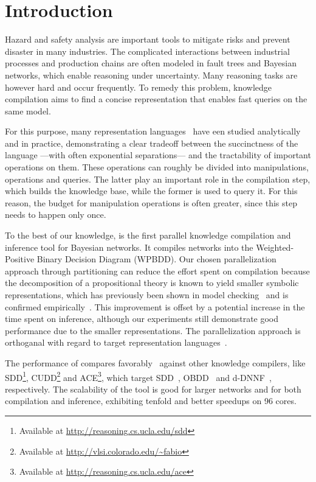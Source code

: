 
\section{Introduction}
\label{sec:introduction}

Hazard and safety analysis are important tools to mitigate risks and prevent disaster in many industries. The complicated interactions between industrial processes and production chains are often modeled in fault trees and Bayesian networks, which enable reasoning under uncertainty.
Many reasoning tasks are however hard and occur frequently. To remedy this problem, knowledge compilation aims to find a concise representation that enables fast queries on the same model.

For this purpose, many representation languages~\cite{darwiche2001decomposable,darwiche2002logical,darwiche2011sdd,darwiche2002knowledge,fargier2014knowledge,sanner2005affine,tafertshofer1997factored} have een studied analytically and in practice, demonstrating a clear tradeoff between the succinctness of the language ---with often exponential separations--- and the tractability of important operations on them. These operations can roughly be divided into manipulations, operations and queries. The latter play an important role in the compilation step, which builds the knowledge base, while the former is used to query it. For this reason, the budget for manipulation operations is often greater, since this step needs to happen only once.

To the best of our knowledge, \toolname is the first parallel knowledge compilation and inference tool for Bayesian networks. It compiles networks into the Weighted-Positive Binary Decision Diagram (WPBDD). Our chosen parallelization approach through partitioning can reduce the effort spent on compilation because the decomposition of a propositional theory is known to yield smaller symbolic representations, which has previously been shown in model checking~\cite{narayan1996partitioned,sahoo2004partitioning,grumberg2006work} and is confirmed empirically~\cite{dal2017reducing}.
 This improvement is offset by a potential increase in the time spent on inference, although our experiments still demonstrate good performance due to the smaller representations. The parallelization approach is orthoganal with regard to target representation languages~\cite{dal2018parallel}.

The performance of \toolname compares favorably~\cite{dal2018parallel} against other knowledge compilers, like  SDD\footnote{Available at \url{http://reasoning.cs.ucla.edu/sdd}}, CUDD\footnote{Available at \url{http://vlsi.colorado.edu/~fabio}} and ACE\footnote{Available at \url{http://reasoning.cs.ucla.edu/ace}}, which target SDD~\cite{darwiche2011sdd}, OBDD~\cite{bryant1986graph} and d-DNNF~\cite{darwiche2002knowledge}, respectively.
The scalability of the tool is good for larger networks and for both compilation and inference, exhibiting tenfold and better speedups on 96 cores.


